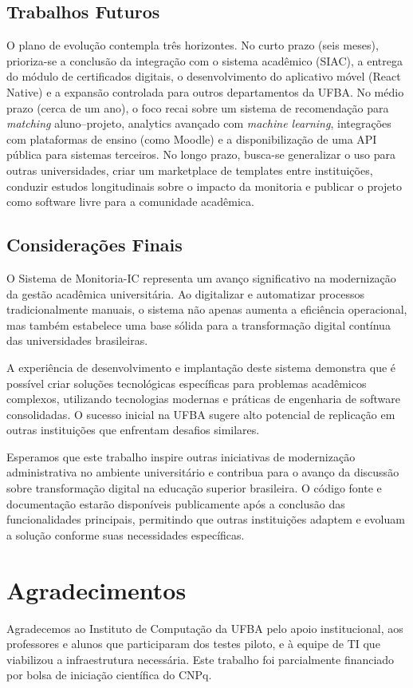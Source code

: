 \documentclass[portuguese]{sbc2025}%
\begin{document}
\subsection{Trabalhos Futuros}

O plano de evolução contempla três horizontes. No curto prazo (seis meses), prioriza-se a conclusão da integração com o sistema acadêmico (SIAC), a entrega do módulo de certificados digitais, o desenvolvimento do aplicativo móvel (React Native) e a expansão controlada para outros departamentos da UFBA. No médio prazo (cerca de um ano), o foco recai sobre um sistema de recomendação para \textit{matching} aluno–projeto, analytics avançado com \textit{machine learning}, integrações com plataformas de ensino (como Moodle) e a disponibilização de uma API pública para sistemas terceiros. No longo prazo, busca-se generalizar o uso para outras universidades, criar um marketplace de templates entre instituições, conduzir estudos longitudinais sobre o impacto da monitoria e publicar o projeto como software livre para a comunidade acadêmica.

\subsection{Considerações Finais}

O Sistema de Monitoria-IC representa um avanço significativo na modernização da gestão acadêmica universitária. Ao digitalizar e automatizar processos tradicionalmente manuais, o sistema não apenas aumenta a eficiência operacional, mas também estabelece uma base sólida para a transformação digital contínua das universidades brasileiras.

A experiência de desenvolvimento e implantação deste sistema demonstra que é possível criar soluções tecnológicas específicas para problemas acadêmicos complexos, utilizando tecnologias modernas e práticas de engenharia de software consolidadas. O sucesso inicial na UFBA sugere alto potencial de replicação em outras instituições que enfrentam desafios similares.

Esperamos que este trabalho inspire outras iniciativas de modernização administrativa no ambiente universitário e contribua para o avanço da discussão sobre transformação digital na educação superior brasileira. O código fonte e documentação estarão disponíveis publicamente após a conclusão das funcionalidades principais, permitindo que outras instituições adaptem e evoluam a solução conforme suas necessidades específicas.

\section*{Agradecimentos}

Agradecemos ao Instituto de Computação da UFBA pelo apoio institucional, aos professores e alunos que participaram dos testes piloto, e à equipe de TI que viabilizou a infraestrutura necessária. Este trabalho foi parcialmente financiado por bolsa de iniciação científica do CNPq.



\end{document}
